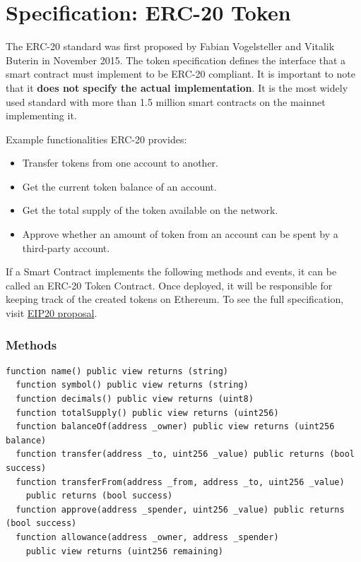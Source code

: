 \documentclass[12pt]{article}
\begin{document}
\section{Specification: ERC-20 Token}

The ERC-20 standard was first proposed by Fabian Vogelsteller and Vitalik Buterin in November 2015. The token specification defines the interface that a smart contract must implement to be ERC-20 compliant. It is important to note that it \textbf{does not specify the actual implementation}. It is the most widely used standard with more than 1.5 million smart contracts on the mainnet implementing it.

\medskip
\noindent
Example functionalities ERC-20 provides:

\begin{itemize}
  \item Transfer tokens from one account to another.
  \item Get the current token balance of an account.
  \item Get the total supply of the token available on the network.
  \item Approve whether an amount of token from an account can be spent by a third-party account.
\end{itemize}

If a Smart Contract implements the following methods and events, it can be called an ERC-20 Token Contract. Once deployed, it will be responsible for keeping track of the created tokens on Ethereum. To see the full specification, visit \href{https://eips.ethereum.org/EIPS/eip-20}{EIP20 proposal}.

\subsubsection*{Methods}

\begin{lstlisting}[language=Solidity]
  function name() public view returns (string)
  function symbol() public view returns (string)
  function decimals() public view returns (uint8)
  function totalSupply() public view returns (uint256)
  function balanceOf(address _owner) public view returns (uint256 balance)
  function transfer(address _to, uint256 _value) public returns (bool success)
  function transferFrom(address _from, address _to, uint256 _value) 
    public returns (bool success)
  function approve(address _spender, uint256 _value) public returns (bool success)
  function allowance(address _owner, address _spender) 
    public view returns (uint256 remaining)  
\end{lstlisting}
\end{document}
